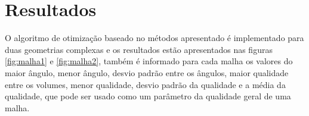 \documentclass[review]{elsarticle}
\begin{document}





\section{Resultados}

O algoritmo de otimização baseado no métodos apresentado é implementado para duas geometrias complexas e os resultados estão apresentados nas figuras \ref{fig:malha1} e \ref{fig:malha2}, também é informado para cada malha os valores do maior ângulo, menor ângulo, desvio padrão entre os ângulos, maior qualidade entre os volumes, menor qualidade, desvio padrão da qualidade e a média da qualidade, que pode ser usado como um parâmetro da qualidade geral de uma malha.
\end{document}
